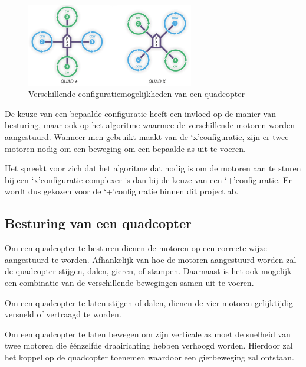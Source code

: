 				\begin{figure}[H]					  
					  \centering
					  \includegraphics[width=0.65\textwidth]{Vooronderzoek/quad_configuraties.png}
					  \caption{Verschillende configuratiemogelijkheden van een quadcopter}
					  \label{quad_config}
				\end{figure}

			\par De keuze van een bepaalde configuratie heeft een invloed op de manier van besturing, maar ook op het algoritme waarmee de verschillende motoren worden aangestuurd. Wanneer men gebruikt maakt van de  \textquoteleft x\textquoteright configuratie, zijn er twee motoren nodig om een beweging om een bepaalde as uit te voeren. 

			\par Het spreekt voor zich dat het algoritme dat nodig is om de motoren aan te sturen bij een  \textquoteleft x\textquoteright configuratie complexer is dan bij de keuze van een  \textquoteleft +\textquoteright configuratie. Er wordt dus gekozen voor de  \textquoteleft +\textquoteright configuratie binnen dit projectlab.

		\subsection{Besturing van een quadcopter}
			
			\par Om een quadcopter te besturen dienen de motoren op een correcte wijze aangestuurd te worden. Afhankelijk van hoe de motoren aangestuurd worden zal de quadcopter stijgen, dalen, gieren, of stampen. Daarnaast is het ook mogelijk een combinatie van de verschillende bewegingen samen uit te voeren.

			\par Om een quadcopter te laten stijgen of dalen, dienen de vier motoren gelijktijdig versneld of vertraagd te worden. 

			\par Om een quadcopter te laten bewegen om zijn verticale as moet de snelheid van twee motoren die \'e\'enzelfde draairichting hebben verhoogd worden. Hierdoor zal het koppel op de quadcopter toenemen waardoor een gierbeweging zal ontstaan.

